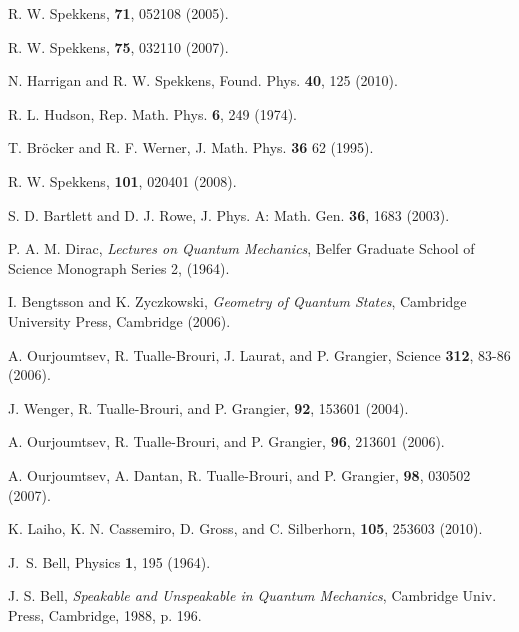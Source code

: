 \documentclass[pra,superscriptaddress,nofootinbib,12pt]{revtex4-2}
\begin{document}
\begin{thebibliography}{9}
 R. W. Spekkens, \pra \textbf{71}, 052108 (2005).

 R. W. Spekkens, \pra \textbf{75}, 032110 (2007).

 N. Harrigan and R. W. Spekkens, Found. Phys. \textbf{40}, 125 (2010).

 R. L. Hudson, Rep. Math. Phys. \textbf{6}, 249 (1974).

 T. Br\"{o}cker and R. F. Werner, J. Math. Phys. \textbf{36} 62 (1995).

 R. W. Spekkens, \prl \textbf{101}, 020401 (2008).

 S. D. Bartlett and D. J. Rowe, J. Phys. A: Math. Gen. \textbf{36}, 1683 (2003).

 P. A. M. Dirac, \textit{Lectures on Quantum Mechanics}, Belfer Graduate School of Science Monograph Series 2, (1964).





 I. Bengtsson and K. Zyczkowski, \textit{Geometry of Quantum States}, Cambridge University Press, Cambridge (2006).


 A. Ourjoumtsev, R. Tualle-Brouri, J. Laurat, and P. Grangier, Science \textbf{312}, 83-86 (2006).

 J. Wenger, R. Tualle-Brouri, and P. Grangier, \prl \textbf{92}, 153601 (2004).

 A. Ourjoumtsev, R. Tualle-Brouri, and P. Grangier, \prl \textbf{96}, 213601 (2006).

 A. Ourjoumtsev, A. Dantan, R. Tualle-Brouri, and P. Grangier, \prl \textbf{98}, 030502 (2007).

 K. Laiho, K. N. Cassemiro, D. Gross, and C. Silberhorn, \prl \textbf{105}, 253603 (2010).



 J.~S. Bell, Physics {\bf 1}, 195 (1964).


 J. S. Bell, \textit{Speakable and Unspeakable in Quantum Mechanics}, Cambridge Univ. Press, Cambridge, 1988, p. 196.


\end{thebibliography}
\end{document}
